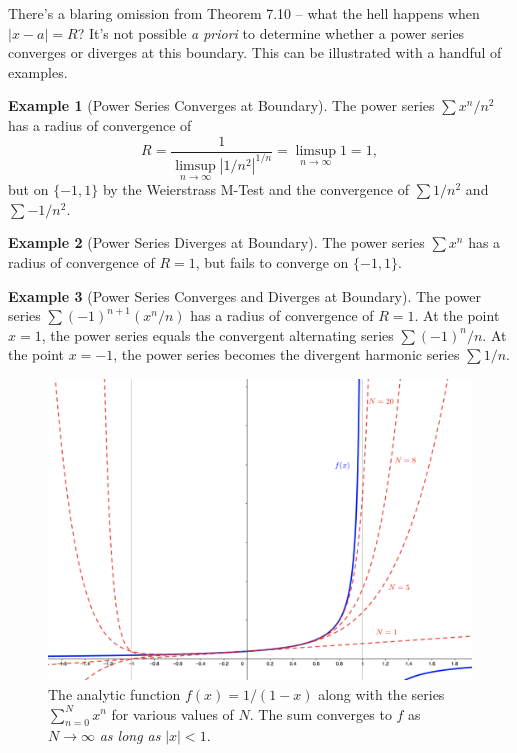 \documentclass{article}
\theoremstyle{definition}
\newtheorem{example}{Example}[section]
\begin{document}
There's a blaring omission from Theorem 7.10 -- what the hell happens when $ |x-a|=R $? It's not possible \textit{a priori} to determine whether a power series converges or diverges at this boundary. This can be illustrated with a handful of examples.

\begin{example}[Power Series Converges at Boundary]
	The power series $ \sum x^n/n^2$ has a radius of convergence of $$ R = \dfrac{1}{\limsup\limits_{n\to\infty}|1/n^2|^{1/n}} = {\limsup\limits_{n\to\infty}1}= 1, $$ but on $ \{-1,1\} $ by the Weierstrass M-Test and the convergence of $ \sum1/n^2 $ and $ \sum-1/n^2 $.
\end{example}
\begin{example}[Power Series Diverges at Boundary]
	The power series $ \sum x^n $ has a radius of convergence of $ R = 1 $, but fails to converge on $ \{-1,1\} $. 
\end{example}
\begin{example}[Power Series Converges and Diverges at Boundary]
	The power series $ \sum(-1)^{n+1}(x^n/n) $ has a radius of convergence of $ R = 1 $. At the point $ x = 1 $, the power series equals the convergent alternating series $ \sum (-1)^n/n$. At the point $ x = -1 $, the power series becomes the divergent harmonic series $ \sum 1/n $.
\end{example}
\begin{figure}
	\centering
	\includegraphics[width=0.9\linewidth]{figures/power_series}
	\caption{The analytic function $ f(x)=1/(1-x) $ along with the series $ \sum_{n=0}^{N}x^n $ for various values of $ N $. The sum converges to $ f $ as $ N\to\infty $ \textit{as long as} $ |x|<1 $.}
	\label{fig:powerseries}
\end{figure}
\end{document}
